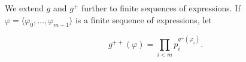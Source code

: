 We extend $g$ and $g^+$ further to finite sequences of expressions. If $\varphi = \langle \varphi_0, \ldots, \varphi_{m-1} \rangle$ is a finite sequence of expressions, let

$$g^{++}(\varphi) = \prod_{i < m} p_i^{g^{+}(\varphi_i)}.$$
